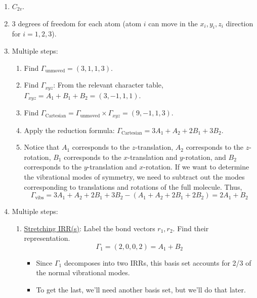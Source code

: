\documentclass[../notes.tex]{subfiles}
\begin{document}
\begin{itemize}
    \begin{enumerate}
        \item $C_{2v}$.
        \item 3 degrees of freedom for each atom (atom $i$ can move in the $x_i,y_i,z_i$ direction for $i=1,2,3$).
        \item Multiple steps:
        \begin{enumerate}
            \item Find $\Gamma_\text{unmoved}=(3,1,1,3)$.
            \item Find $\Gamma_{xyz}$: From the relevant character table, $\Gamma_{xyz}=A_1+B_1+B_2=(3,-1,1,1)$.
            \item Find $\Gamma_\text{Cartesian}=\Gamma_\text{unmoved}\times\Gamma_{xyz}=(9,-1,1,3)$.
            \item Apply the reduction formula: $\Gamma_\text{Cartesian}=3A_1+A_2+2B_1+3B_2$.
            \item Notice that $A_1$ corresponds to the $z$-translation, $A_2$ corresponds to the $z$-rotation, $B_1$ corresponds to the $x$-translation and $y$-rotation, and $B_2$ corresponds to the $y$-translation and $x$-rotation. If we want to determine the vibrational modes of symmetry, we need to subtract out the modes corresponding to translations and rotations of the full molecule. Thus,
            \begin{equation*}
                \Gamma_\text{vibs} = 3A_1+A_2+2B_1+3B_2-(A_1+A_2+2B_1+2B_2)
                = 2A_1+B_2
            \end{equation*}
        \end{enumerate}
        \item Multiple steps:
        \begin{enumerate}
            \item \underline{Stretching IRR(s)}: Label the bond vectors $r_1,r_2$. Find their representation.
            \begin{equation*}
                \Gamma_1 = (2,0,0,2)
                = A_1+B_2
            \end{equation*}
            \begin{itemize}
                \item Since $\Gamma_1$ decomposes into two IRRs, this basis set accounts for 2/3 of the normal vibrational modes.
                \item To get the last, we'll need another basis set, but we'll do that later.
            \end{itemize}

\end{enumerate}
\end{enumerate}
\end{itemize}
\end{document}
